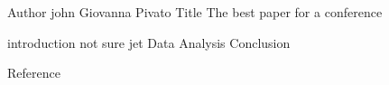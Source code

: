 Author john Giovanna Pivato
Title The best paper for a conference

introduction not sure jet
Data
Analysis
Conclusion

Reference
